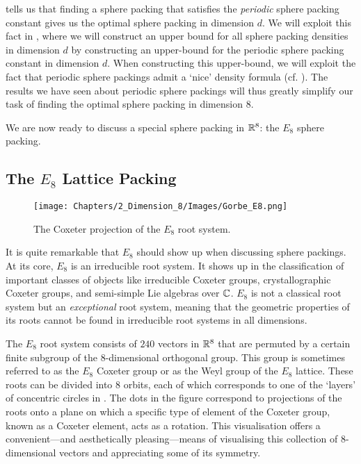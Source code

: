  tells us that finding a sphere packing that satisfies the \textit{periodic} sphere packing constant gives us the optimal sphere packing in dimension $d$. We will exploit this fact in , where we will construct an upper bound for all sphere packing densities in dimension $d$ by constructing an upper-bound for the periodic sphere packing constant in dimension $d$. When constructing this upper-bound, we will exploit the fact that periodic sphere packings admit a `nice' density formula (cf. ). The results we have seen about periodic sphere packings will thus greatly simplify our task of finding the optimal sphere packing in dimension $8$.

We are now ready to discuss a special sphere packing in $\mathbb{R}^8$: the $E_8$ sphere packing.

\subsection{The $E_8$ Lattice Packing}\label{Ch2:Subsec:E8}

\begin{wrapfigure}[18]{r}{0.5\linewidth}
    \vspace{-3em}
    \centering
    \texttt{[image: Chapters/2\_Dimension\_8/Images/Gorbe\_E8.png]}
    \caption{The Coxeter projection of the $E_8$ root system. \cite{Gorbe_E8}}
    \label{Ch2:Fig:Gorbe_E8}
\end{wrapfigure}

It is quite remarkable that $E_8$ should show up when discussing sphere packings. At its core, $E_8$ is an irreducible root system. It shows up in the classification of important classes of objects like irreducible Coxeter groups, crystallographic Coxeter groups, and semi-simple Lie algebras over $\mathbb{C}$. $E_8$ is not a classical root system but an \textit{exceptional} root system, meaning that the geometric properties of its roots cannot be found in irreducible root systems in all dimensions.

The $E_8$ root system consists of $240$ vectors in $\mathbb{R}^8$ that are permuted by a certain finite subgroup of the $8$-dimensional orthogonal group. This group is sometimes referred to as the $E_8$ Coxeter group or as the Weyl group of the $E_8$ lattice. These roots can be divided into $8$ orbits, each of which corresponds to one of the `layers' of concentric circles in . The dots in the figure correspond to projections of the roots onto a plane on which a specific type of element of the Coxeter group, known as a Coxeter element, acts as a rotation. This visualisation offers a convenient---and aesthetically pleasing---means of visualising this collection of $8$-dimensional vectors and appreciating some of its symmetry.



